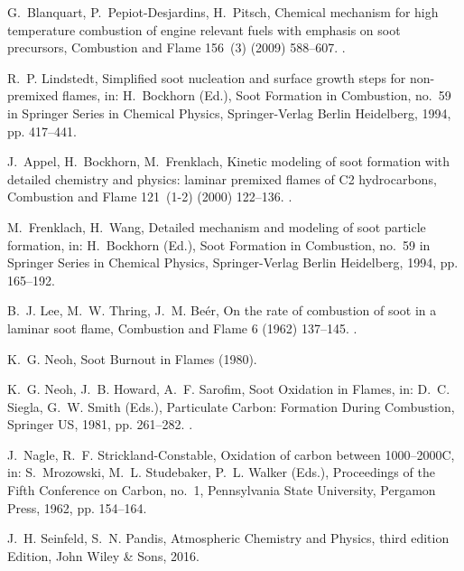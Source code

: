\documentclass[preprint,letterpaper]{elsarticle}
\begin{document}
\begin{thebibliography}{00}
G.~Blanquart, P.~Pepiot-Desjardins, H.~Pitsch, {Chemical mechanism for high
temperature combustion of engine relevant fuels with emphasis on soot
precursors}, {Combustion and Flame} 156~(3) (2009) 588--607.
\newblock \href {http://dx.doi.org/10.1016/j.combustflame.2008.12.007}
  {}.

R.~P. Lindstedt, {Simplified soot nucleation and surface growth steps for
non-premixed flames}, in: H.~Bockhorn (Ed.), {Soot Formation in Combustion},
no.~59 in {Springer Series in Chemical Physics}, {Springer-Verlag Berlin
Heidelberg}, 1994, pp. 417--441.

J.~Appel, H.~Bockhorn, M.~Frenklach, {Kinetic modeling of soot formation with
detailed chemistry and physics: laminar premixed flames of C2 hydrocarbons},
{Combustion and Flame} 121~(1-2) (2000) 122--136.
\newblock \href {http://dx.doi.org/10.1016/S0010-2180(99)00135-2}
  {}.

M.~Frenklach, H.~Wang, {Detailed mechanism and modeling of soot particle
formation}, in: H.~Bockhorn (Ed.), {Soot Formation in Combustion}, no.~59 in
{Springer Series in Chemical Physics}, {Springer-Verlag Berlin Heidelberg},
1994, pp. 165--192.

B.~J. Lee, M.~W. Thring, J.~M. Be{\'e}r, {On the rate of combustion of soot in
a laminar soot flame}, {Combustion and Flame} 6 (1962) 137--145.
\newblock \href {http://dx.doi.org/10.1016/0010-2180(62)90082-2}
  {}.

K.~G. Neoh, {Soot Burnout in Flames} (1980).

K.~G. Neoh, J.~B. Howard, A.~F. Sarofim, {Soot Oxidation in Flames}, in: D.~C.
Siegla, G.~W. Smith (Eds.), {Particulate Carbon: Formation During
Combustion}, {Springer US}, 1981, pp. 261--282.
\newblock \href {http://dx.doi.org/10.1007/978-1-4757-6137-5_9}
  {}.

J.~Nagle, R.~F. Strickland-Constable, {Oxidation of carbon between
1000--2000C}, in: S.~Mrozowski, M.~L. Studebaker, P.~L. Walker (Eds.),
{Proceedings of the Fifth Conference on Carbon}, no.~1, {Pennsylvania State
University}, {Pergamon Press}, 1962, pp. 154--164.

J.~H. Seinfeld, S.~N. Pandis, {Atmospheric Chemistry and Physics}, third
edition Edition, {John Wiley {\&} Sons}, 2016.


\end{thebibliography}
\end{document}
